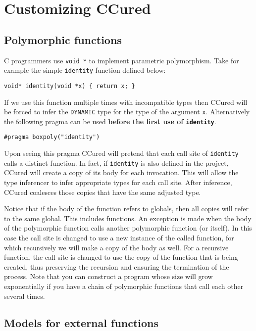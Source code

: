 \documentclass{book}
\def\t#1{{\tt #1}}
\begin{document}
\chapter{Customizing CCured}

  \section{Polymorphic functions}

 C programmers use \t{void *} to implement parametric polymorphism. Take for
example the simple \t{identity} function defined below:

\begin{verbatim}
void* identity(void *x) { return x; }
\end{verbatim}

 If we use this function multiple times with incompatible types then CCured
will be forced to infer the \t{DYNAMIC} type for the type of the argument
\t{x}. Alternatively the following pragma can be used {\bf before the first
use of \t{identity}}. 

\begin{verbatim}
#pragma boxpoly("identity")
\end{verbatim}
 
 Upon seeing this pragma CCured will pretend that each call site of
\t{identity} calls a distinct function. In fact, if \t{identity} is also
defined in the project, CCured will create a copy of its body for each
invocation. This will allow the type inferencer to infer appropriate types for
each call site. After inference, CCured coalesces those copies that have the
same adjusted type.

 Notice that if the body of the function refers to globals, then all copies
will refer to the same global. This includes functions. An exception is made
when the body of the polymorphic function calls another polymorphic function
(or itself). In this case the call site is changed to use a new instance of
the called function, for which recursively we will make a copy of the body as
well. For a recursive function, the call site is changed to use the copy of
the function that is being created, thus preserving the recursion and ensuring
the termination of the process. Note that you can construct a program whose
size will grow exponentially if you have a chain of polymorphic functions that
call each other several times. 

  \section{Models for external functions}
\end{document}
